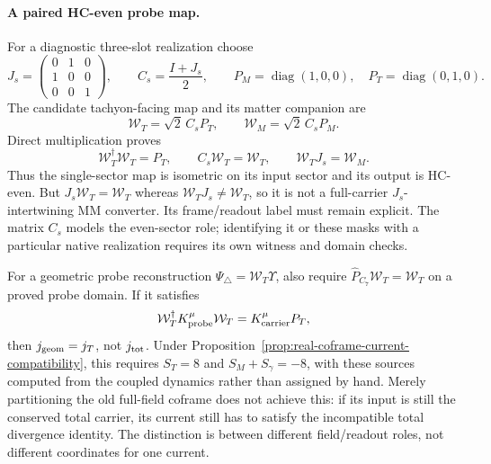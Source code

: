 \paragraph{A paired HC-even probe map.}
For a diagnostic three-slot realization choose
\[
  J_s=\begin{pmatrix}0&1&0\\1&0&0\\0&0&1\end{pmatrix},\qquad
  C_s=\frac{I+J_s}{2},\qquad
  P_M=\operatorname{diag}(1,0,0),\quad
  P_T=\operatorname{diag}(0,1,0).
\]
The candidate tachyon-facing map and its matter companion are
\[
  \mathcal W_T=\sqrt2\,C_sP_T,\qquad
  \mathcal W_M=\sqrt2\,C_sP_M.
\]
Direct multiplication proves
\[
  \mathcal W_T^\dagger\mathcal W_T=P_T,\qquad
  C_s\mathcal W_T=\mathcal W_T,\qquad
  \mathcal W_TJ_s=\mathcal W_M.
\]
Thus the single-sector map is isometric on its input sector and its
output is HC-even. But $J_s\mathcal W_T=\mathcal W_T$ whereas
$\mathcal W_TJ_s\ne\mathcal W_T$, so it is not a full-carrier
$J_s$-intertwining MM converter. Its frame/readout label must remain
explicit. The matrix $C_s$ models the even-sector role; identifying it
or these masks with a particular native realization requires its own
witness and domain checks.

For a geometric probe reconstruction
$\Psi_\triangle=\mathcal W_T\Upsilon$, also require
$\hat P_{C_7}\mathcal W_T=\mathcal W_T$ on a proved probe domain.
If it satisfies
\[
  \mathcal W_T^\dagger K_{\rm probe}^\mu\mathcal W_T
  =K_{\rm carrier}^\mu P_T,
\]
then $j_{\rm geom}=j_T$, not $j_{\rm tot}$. Under
Proposition~\ref{prop:real-coframe-current-compatibility}, this requires
$S_T=8$ and $S_M+S_\gamma=-8$, with these sources computed from the
coupled dynamics rather than assigned by hand. Merely partitioning
the old full-field coframe does not achieve this: if its input is still
the conserved total carrier, its current still has to satisfy the
incompatible total divergence identity. The distinction is between
different field/readout roles, not different coordinates for one current.

